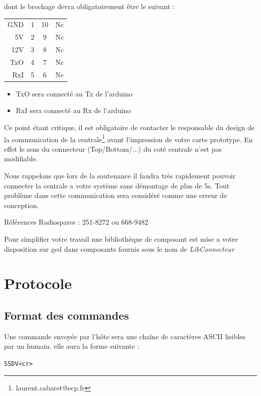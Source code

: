 \documentclass[a4paper, 10pt]{article} %
\begin{document}
dont le brochage devra obligatoirement être le suivant :

\begin{center}
\begin{tabular}{r|c||c|l}
GND&1&10&Nc\\
5V&2&9&Nc\\
12V&3&8&Nc\\
TxO&4&7&Nc\\
RxI&5&6&Nc\\
\end{tabular}
\end{center}


\begin{itemize}
\item TxO sera connecté au Tx de l'arduino
\item RxI sera connecté au Rx de l'arduino
\end{itemize}


Ce point étant critique, il est obligatoire de contacter le responsable du design de la communication de la centrale\footnote{laurent.cabaret@ecp.fr} avant l'impression  de votre carte prototype.
En effet le sens du connecteur (Top/Bottom/...) du coté centrale n'est pas modifiable.

Nous rappelons que lors de la soutenance il faudra très rapidement pouvoir connecter la centrale a votre système sans démontage de plus de 5s. Tout problème dans cette communication sera considéré comme une erreur de conception.

Références Radiospares : 251-8272 ou 668-9482

Pour simplifier votre travail une bibliothèque de composant est mise a votre disposition sur ged dans composants fournis sous le nom de \emph{LibConnecteur}

\section{Protocole}

\subsection{Format des commandes}

Une commande envoyée par l'hôte sera une chaîne de caractères ASCII lisibles par un humain. elle aura la
forme suivante :
\begin{center}
  \verb|SSDV<cr>|
\end{center}
\end{document}
